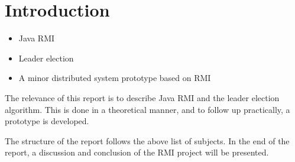 \chapter{Introduction}
\begin{itemize}
\item Java RMI
\item Leader election
\item A minor distributed system prototype based on RMI
\end{itemize}

The relevance of this report is to describe Java RMI and the leader election algorithm.
This is done in a theoretical manner, and to follow up practically, a prototype is developed.

The structure of the report follows the above list of subjects. In the end of the report, a discussion and conclusion of the RMI project will be presented. 